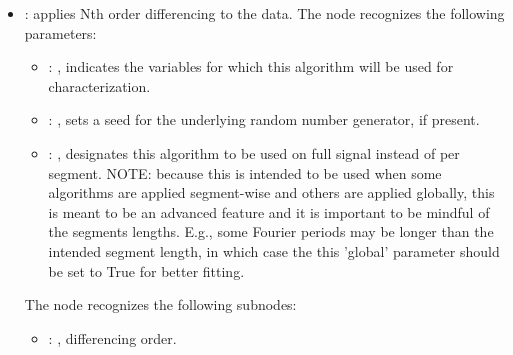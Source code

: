 \begin{itemize}
    \item {}:
      applies Nth order differencing to the data.
      The  node recognizes the following parameters:
        \begin{itemize}
          \item {}: ,
            indicates the variables for which this algorithm will be used for characterization.
          \item {}: ,
            sets a seed for the underlying random number generator, if present.
          \item {}: ,
            designates this algorithm to be used on full signal instead of per
            segment. NOTE: because this is intended to be used when some algorithms are
            applied segment-wise and others are applied globally, this is meant to be an
            advanced feature and it is important to be mindful of the segments lengths.
            E.g., some Fourier periods may be longer than the intended segment length, in
            which case the this 'global' parameter should be set to True for better
            fitting. 
      \end{itemize}

      The  node recognizes the following subnodes:
      \begin{itemize}
        \item {}: ,
          differencing order.
      \end{itemize}


\end{itemize}

